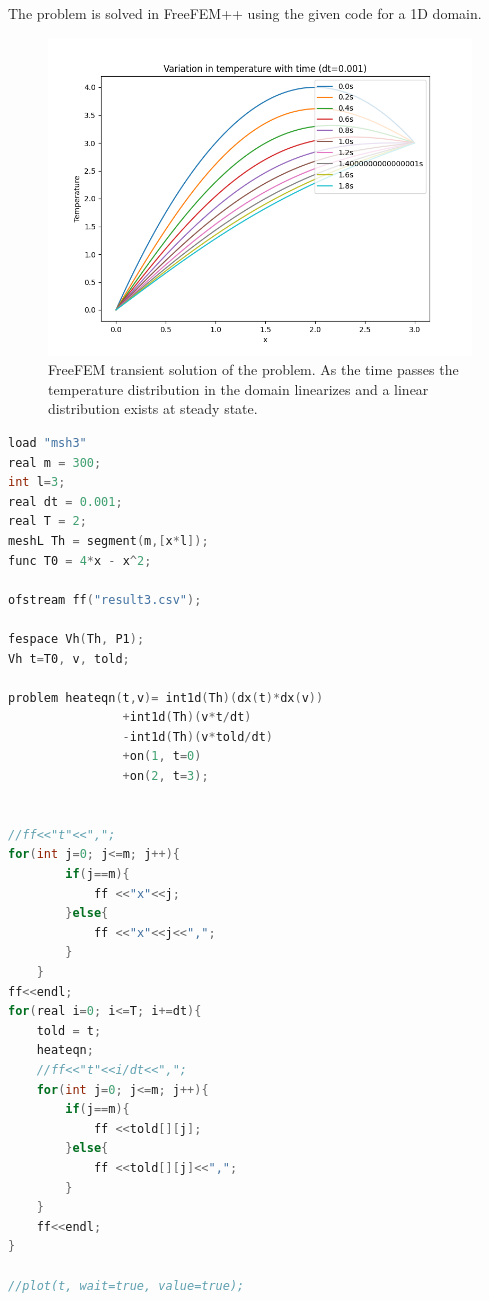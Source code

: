 \documentclass[11pt]{article} %
\begin{document}
\vspace{0.5cm}

The problem is solved in FreeFEM++ using the given code for a 1D domain. 

\begin{figure}[H]
\centering
\includegraphics[width=\textwidth]{figures/p31.png}
\caption{FreeFEM transient solution of the problem. As the time passes the temperature distribution in the domain linearizes and a linear distribution exists at steady state.}
\end{figure}
\newpage
\begin{lstlisting}[language=C++, caption=Problem 3 Code ]
load "msh3"
real m = 300;
int l=3;
real dt = 0.001;
real T = 2;
meshL Th = segment(m,[x*l]);
func T0 = 4*x - x^2; 

ofstream ff("result3.csv");

fespace Vh(Th, P1);
Vh t=T0, v, told;

problem heateqn(t,v)= int1d(Th)(dx(t)*dx(v))
				+int1d(Th)(v*t/dt)
				-int1d(Th)(v*told/dt)
				+on(1, t=0)
				+on(2, t=3);


//ff<<"t"<<",";
for(int j=0; j<=m; j++){
		if(j==m){
			ff <<"x"<<j;
		}else{
			ff <<"x"<<j<<",";
		}
	}
ff<<endl;
for(real i=0; i<=T; i+=dt){
	told = t;
	heateqn;
	//ff<<"t"<<i/dt<<",";
	for(int j=0; j<=m; j++){
		if(j==m){
			ff <<told[][j];
		}else{
			ff <<told[][j]<<",";
		}
	}
	ff<<endl;
}

//plot(t, wait=true, value=true);
\end{lstlisting}
\end{document}
